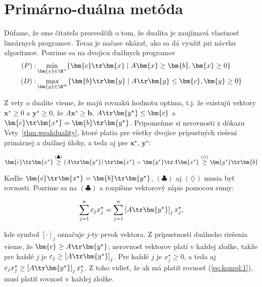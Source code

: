 \section{Primárno-duálna metóda}

\noindent
Dúfame, že sme čitateľa presvedčili o tom, že dualita je zaujímavá vlastnosť lineárnych
programov. Teraz je načase ukázať, ako sa dá využiť pri návrhu algoritmov. Pozrime sa na dvojicu
duálnych programov
\begin{eqnarray*}
  (P):&\min\limits_{\bm{x}\in\R^n}\{\bm{c}\tr\bm{x}\mid A\bm{x}\ge\bm{b}, \bm{x}\ge 0\}\\
  (D):&\max\limits_{\bm{y}\in\R^m}\{\bm{b}\tr\bm{y}\mid A\tr\bm{y}\le\bm{c}, \bm{y}\ge 0\}
\end{eqnarray*}

\noindent
Z vety o dualite vieme, že majú rovnakú hodnotu optima, t.j. že existujú vektory $\bm{x^\star}\ge0$
a $\bm{y^\star}\ge0$, že 
$A\bm{x^\star}\ge\bm{b}$, $A\tr\bm{y^\star}\le\bm{c}$
a
$\bm{c}\tr\bm{x^\star}=\bm{b}\tr\bm{y^\star}$.
Pripomeňme si nerovnosti z dôkazu Vety~\ref{thm:weakduality}, ktoré platia pre všetky dvojice prípustných
riešení primárnej a duálnej úlohy, a teda aj pre $\bm{x^\star}$, $\bm{y^\star}$:

\begin{equation}
  \label{eq:proofSlack}
  \bm{c}\tr\bm{x^\star}\stackrel{(\clubsuit)}{\ge}\left(A\tr\bm{y^\star}\right)\tr\bm{x^\star}
=\bm{y^\star}\tr A\bm{x^\star}\stackrel{(\diamondsuit)}{\ge}\bm{y^\star}\tr\bm{b}
\end{equation}

\noindent
Keďže $\bm{c}\tr\bm{x^\star}=\bm{b}\tr\bm{y^\star}$, $(\clubsuit)$ aj $(\diamondsuit)$ musia
byť rovnosti. Pozrime sa na $(\clubsuit)$ a rozpíšme vektorový zápis pomocou sumy:

\begin{equation}
  \label{eq:kompl:1}
  \sum_{j=1}^n c_jx^\star_j=\sum_{j=1}^n\left[A\tr\bm{y^\star}\right]_jx^\star_j,
\end{equation}

\noindent
kde symbol $[\cdot]_j$ označuje $j$-ty prvok vektora. Z prípustnosti duálneho riešenia vieme, že
$\bm{c}\ge A\tr\bm{y^\star}$; nerovnosť vektorov platí v každej zložke, takže pre každé $j$ je
$c_j\ge\left[A\tr\bm{y^\star}\right]_j$.
Pre každé $j$ je  $x^\star_j\ge0$, a teda aj $c_jx^\star_j\ge\left[A\tr\bm{y^\star}\right]_jx^\star_j$.
Z toho vidieť, že ak má platiť rovnosť (\ref{eq:kompl:1}), musí platiť rovnosť v každej zložke.

